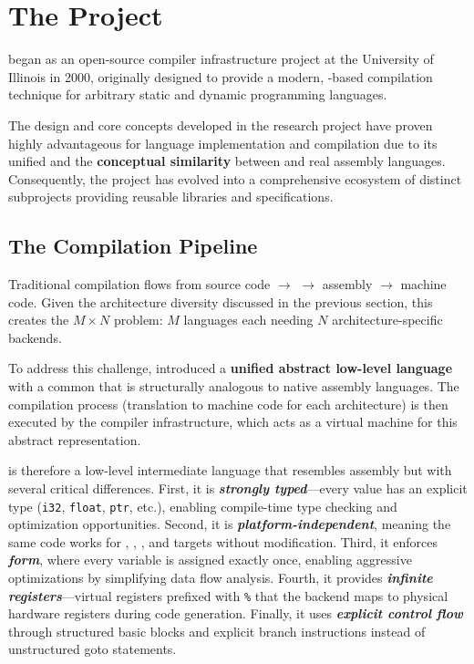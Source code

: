 \section{The   Project}
 began as an open-source compiler infrastructure project at the University of Illinois in 2000, originally designed to provide a modern, -based compilation technique for arbitrary static and dynamic programming languages.

The design and core concepts developed in the  research project have proven highly advantageous for language implementation and compilation due to its unified  and the \textbf{conceptual similarity} between   and real assembly languages. Consequently, the project has evolved into a comprehensive ecosystem of distinct subprojects providing reusable libraries and  specifications.

\subsection{The Compilation Pipeline}
Traditional compilation flows from source code $\rightarrow$  $\rightarrow$ assembly $\rightarrow$ machine code. Given the architecture diversity discussed in the previous section, this creates the $M \times N$ problem: $M$ languages each needing $N$ architecture-specific backends.

To address this challenge,  introduced a \textbf{unified abstract low-level language} with a common  that is structurally analogous to native assembly languages. The compilation process (translation to machine code for each architecture) is then executed by the  compiler infrastructure, which acts as a virtual machine for this abstract representation.

  is therefore a low-level intermediate language that resembles assembly but with several critical differences. First, it is \textbf{\textit{strongly typed}}---every value has an explicit type (\texttt{i32}, \texttt{float}, \texttt{ptr}, etc.), enabling compile-time type checking and optimization opportunities. Second, it is \textbf{\textit{platform-independent}}, meaning the same  code works for , , , and  targets without modification. Third, it enforces \textbf{\textit{ form}}, where every variable is assigned exactly once, enabling aggressive optimizations by simplifying data flow analysis. Fourth, it provides \textbf{\textit{infinite registers}}---virtual registers prefixed with \texttt{\%} that the backend maps to physical hardware registers during code generation. Finally, it uses \textbf{\textit{explicit control flow}} through structured basic blocks and explicit branch instructions instead of unstructured goto statements.

